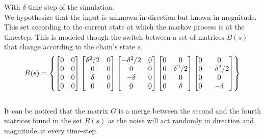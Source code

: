 \documentclass[twocolumn]{article}
\begin{document}
    With $\delta$ time step of the simulation.
    \\
    We hypothesize that the input is unknown in direction but known in magnitude. This set according to the current state at which the markov process is at the timestep.
    This is modeled though the switch between a set of matrices $B(s)$ that change according to the chain's state $s$.
    \begin{equation*}%
        \resizebox{.9 \columnwidth}{!}{
        $B(s)=\begin{Bmatrix}
            \begin{bmatrix}
                0 & 0 \\
                0          & 0 \\
                0     & 0 \\
                0          & 0 \\
            \end{bmatrix}
            \begin{bmatrix}
                \delta^2/2 & 0 \\
                0          & 0 \\
                \delta     & 0 \\
                0          & 0 \\
            \end{bmatrix}
            \begin{bmatrix}
                -\delta^2/2 & 0 \\
                0          & 0 \\
                -\delta     & 0 \\
                0          & 0 \\
            \end{bmatrix}
            \begin{bmatrix}
                0 & 0          \\
                0 & \delta^2/2 \\
                0 & 0          \\
                0 & \delta     \\
            \end{bmatrix}
            \begin{bmatrix}
                0 & 0          \\
                0 & -\delta^2/2 \\
                0 & 0          \\
                0 & -\delta     \\
            \end{bmatrix}
        \end{Bmatrix} $ 
        }
    \end{equation*}
    \\
    It can be noticed that the matrix $G$ is a merge between the second and the fourth matrices found in the set $B(s)$ as the noise will act
    randomly in direction and magnitude at every time-step.
\end{document}

